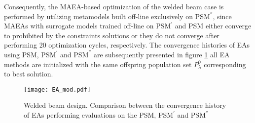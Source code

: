 \begin{table}[h!]
\centering
\caption{\textbf{C}, \textbf{F} responses to $\vec{β}$ found 
via MAEAs with off-line training in case 3}
\label{table:offline_case3_deviation_welded_beam}
\end{table}

Consequently, the MAEA-based optimization of the welded beam case 
is performed by utilizing metamodels built off-line exclusively on 
$\mathrm{PSM}^{''}$, since MAEAs with surrogate models trained 
off-line on $\mathrm{PSM}^{'}$ and PSM either converge to 
prohibited by the constraints solutions or they do not converge 
after performing 20 optimization cycles, respectively. The 
convergence histories of EAs using PSM, $\mathrm{PSM}^{'}$ and $
\mathrm{PSM}^{''}$ are subsequently presented in figure 
\ref{fig:convergence_PSMs} all EA methods are initialized with the 
same offspring population set $P_{λ}^{0}$ corresponding to best 
solution.

\begin{figure}[h!]
\centering
\texttt{[image: EA\_mod.pdf]}   
\caption{Welded beam design. Comparison between the 
convergence history of EAs performing evaluations on the PSM, 
$\mathrm{PSM}^{'}$ and $\mathrm{PSM}^{''}$} 
\label{fig:convergence_PSMs}
\end{figure}

\newpage


